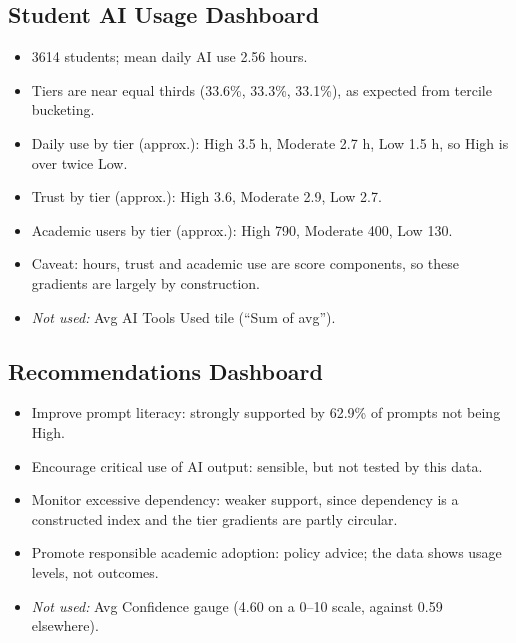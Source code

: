 \documentclass[11pt,a4paper]{article}
\renewcommand{\_}{\textunderscore\hspace{0pt}}
\begin{document}
\subsection{Student AI Usage Dashboard}
\begin{itemize}
  \item \num{3614} students; mean daily AI use 2.56 hours.
  \item Tiers are near equal thirds (33.6\%, 33.3\%, 33.1\%), as expected from tercile bucketing.
  \item Daily use by tier (approx.): High 3.5 h, Moderate 2.7 h, Low 1.5 h, so High is over twice Low.
  \item Trust by tier (approx.): High 3.6, Moderate 2.9, Low 2.7.
  \item Academic users by tier (approx.): High 790, Moderate 400, Low 130.
  \item Caveat: hours, trust and academic use are score components, so these gradients are largely by construction.
  \item \emph{Not used:} Avg AI Tools Used tile (``Sum of avg'').
\end{itemize}

\subsection{Recommendations Dashboard}
\begin{itemize}
  \item Improve prompt literacy: strongly supported by 62.9\% of prompts not being High.
  \item Encourage critical use of AI output: sensible, but not tested by this data.
  \item Monitor excessive dependency: weaker support, since dependency is a constructed index and the tier gradients are partly circular.
  \item Promote responsible academic adoption: policy advice; the data shows usage levels, not outcomes.
  \item \emph{Not used:} Avg Confidence gauge (4.60 on a 0--10 scale, against 0.59 elsewhere).
\end{itemize}
\end{document}
